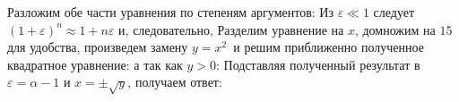 \documentclass[a4paper, 12pt]{article}
\begin{document}
Разложим обе части уравнения по степеням аргументов:
Из $\varepsilon \ll 1$ следует $(1 + \varepsilon)^n \approx 1 + n\varepsilon$ и, следовательно,
Разделим уравнение на $x$, домножим на $15$ для удобства, произведем замену $y = x^2$\
и решим приближенно полученное квадратное уравнение:
а так как $y > 0$:
Подставляя полученный результат в $\varepsilon = \alpha - 1$ и $x = \pm\sqrt{y}$, получаем ответ:
\salign[*]{\boxed{\tilde{x}_0 = 0,\ \tilde{x}_{1,2} \approx \pm\sqrt[4]{15(\alpha - 1)}}}
\end{document}
